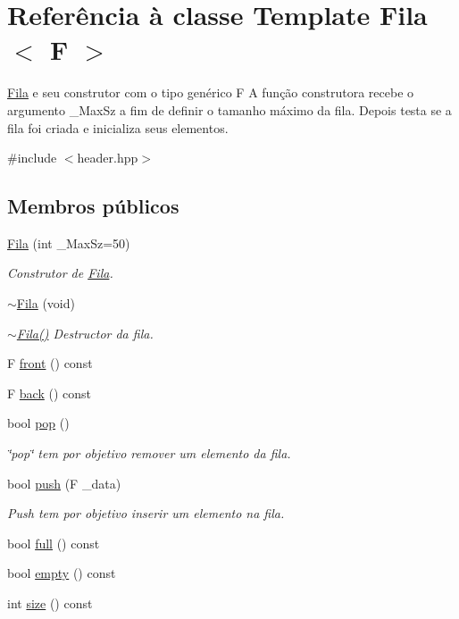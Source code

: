 \hypertarget{class_fila}{\section{Referência à classe Template Fila$<$ F $>$}
\label{class_fila}
}


\hyperlink{class_fila}{Fila} e seu construtor com o tipo genérico F A função construtora recebe o argumento \-\_\-\-Max\-Sz a fim de definir o tamanho máximo da fila. Depois testa se a fila foi criada e inicializa seus elementos.  




{\ttfamily \#include $<$header.\-hpp$>$}

\subsection*{Membros públicos}
\begin{DoxyCompactItemize}
\item 
\hyperlink{class_fila_a11bc5b99c65f357b02dae4251709972a}{Fila} (int \-\_\-\-Max\-Sz=50)
\begin{DoxyCompactList}\small\item\em Construtor de \hyperlink{class_fila}{Fila}. \end{DoxyCompactList}\item 
\hyperlink{class_fila_a0697238583644bd3b18c8c6517210cab}{$\sim$\-Fila} (void)
\begin{DoxyCompactList}\small\item\em \hyperlink{class_fila_a0697238583644bd3b18c8c6517210cab}{$\sim$\-Fila()} Destructor da fila. \end{DoxyCompactList}\item 
F \hyperlink{class_fila_af323c8cedb04bb0e53e0edf826d9fde8}{front} () const 
\item 
F \hyperlink{class_fila_a80a0eaaec0f54359e2f11eb1637d6031}{back} () const 
\item 
bool \hyperlink{class_fila_a27d8db9bcef9588464aba53a13a785f3}{pop} ()
\begin{DoxyCompactList}\small\item\em \char`\"{}pop\char`\"{} tem por objetivo remover um elemento da fila. \end{DoxyCompactList}\item 
bool \hyperlink{class_fila_a7ebd20b2959bab8c06c9955c9a3b6d54}{push} (F \-\_\-data)
\begin{DoxyCompactList}\small\item\em Push tem por objetivo inserir um elemento na fila. \end{DoxyCompactList}\item 
bool \hyperlink{class_fila_ae984739241b16a0118085ba0cc5651a3}{full} () const 
\item 
bool \hyperlink{class_fila_a66006c07dca654037c25d02b988c4f26}{empty} () const 
\item 
int \hyperlink{class_fila_a0ff47e7857a324066e9d6457082d8c5b}{size} () const 
\end{DoxyCompactItemize}
